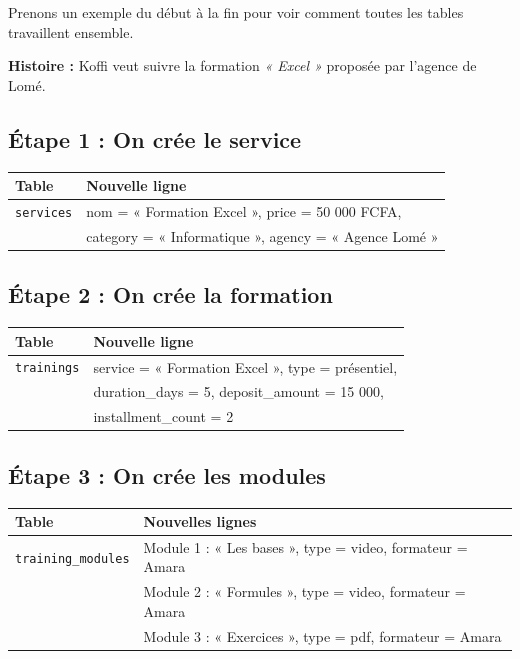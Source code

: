 \documentclass[12pt,a4paper]{article}
\begin{document}
Prenons un exemple du début à la fin pour voir comment toutes les tables travaillent ensemble.

\begin{exemplebox}
\textbf{Histoire :} Koffi veut suivre la formation \textit{« Excel »} proposée par l'agence de Lomé.
\end{exemplebox}

\subsection*{Étape 1 : On crée le service}

\begin{tabularx}{\textwidth}{l X}
    \textbf{Table} & \textbf{Nouvelle ligne} \\
    \midrule
    \texttt{services} & nom = « Formation Excel », price = 50 000 FCFA, \\
    & category = « Informatique », agency = « Agence Lomé » \\
\end{tabularx}

\subsection*{Étape 2 : On crée la formation}

\begin{tabularx}{\textwidth}{l X}
    \textbf{Table} & \textbf{Nouvelle ligne} \\
    \midrule
    \texttt{trainings} & service = « Formation Excel », type = présentiel, \\
    & duration\_days = 5, deposit\_amount = 15 000, \\
    & installment\_count = 2 \\
\end{tabularx}

\subsection*{Étape 3 : On crée les modules}

\begin{tabularx}{\textwidth}{l X}
    \textbf{Table} & \textbf{Nouvelles lignes} \\
    \midrule
    \texttt{training\_modules} & Module 1 : « Les bases », type = video, formateur = Amara \\
    & Module 2 : « Formules », type = video, formateur = Amara \\
    & Module 3 : « Exercices », type = pdf, formateur = Amara \\
\end{tabularx}
\end{document}

